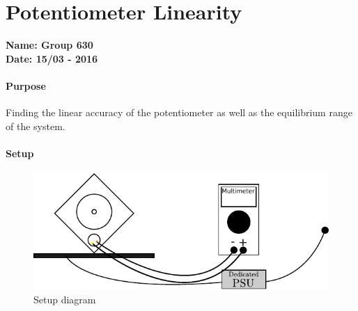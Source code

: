 \chapter{Potentiometer Linearity}\label{app:potentiometerLin} 
\textbf{Name: Group 630}\\
\textbf{Date: 15/03 - 2016}

\subsubsection{Purpose}
Finding the linear accuracy of the potentiometer as well as the equilibrium range of the system.

\subsubsection{Setup}
\begin{figure}[H]
	\centering
	\includegraphics[scale=1]{figures/LabSetupLinearityTest.pdf}
	\caption{Setup diagram}
	\label{LabSetupRangeTest}
\end{figure}\vspace{-5mm}

